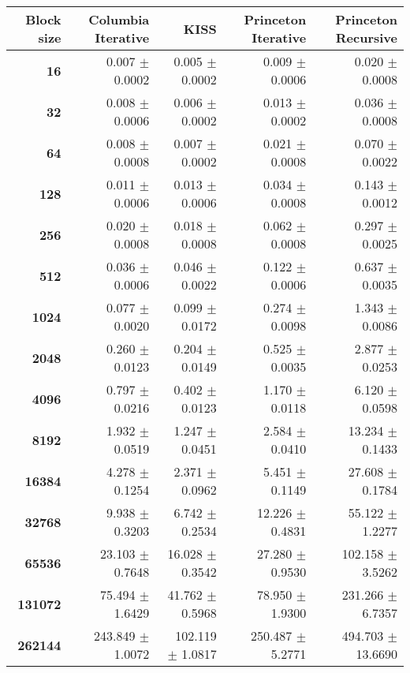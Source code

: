 \begin{tabular}{rrrrr}\toprule
\textbf{Block size}  & \textbf{Columbia Iterative} & \textbf{KISS} & \textbf{Princeton Iterative} & \textbf{Princeton Recursive}\\\midrule
\textbf{16}  & 0.007 $\pm$ 0.0002 & 0.005 $\pm$ 0.0002 & 0.009 $\pm$ 0.0006 & 0.020 $\pm$ 0.0008\\
\textbf{32}  & 0.008 $\pm$ 0.0006 & 0.006 $\pm$ 0.0002 & 0.013 $\pm$ 0.0002 & 0.036 $\pm$ 0.0008\\
\textbf{64}  & 0.008 $\pm$ 0.0008 & 0.007 $\pm$ 0.0002 & 0.021 $\pm$ 0.0008 & 0.070 $\pm$ 0.0022\\
\textbf{128}  & 0.011 $\pm$ 0.0006 & 0.013 $\pm$ 0.0006 & 0.034 $\pm$ 0.0008 & 0.143 $\pm$ 0.0012\\
\textbf{256}  & 0.020 $\pm$ 0.0008 & 0.018 $\pm$ 0.0008 & 0.062 $\pm$ 0.0008 & 0.297 $\pm$ 0.0025\\
\textbf{512}  & 0.036 $\pm$ 0.0006 & 0.046 $\pm$ 0.0022 & 0.122 $\pm$ 0.0006 & 0.637 $\pm$ 0.0035\\
\textbf{1024}  & 0.077 $\pm$ 0.0020 & 0.099 $\pm$ 0.0172 & 0.274 $\pm$ 0.0098 & 1.343 $\pm$ 0.0086\\
\textbf{2048}  & 0.260 $\pm$ 0.0123 & 0.204 $\pm$ 0.0149 & 0.525 $\pm$ 0.0035 & 2.877 $\pm$ 0.0253\\
\textbf{4096}  & 0.797 $\pm$ 0.0216 & 0.402 $\pm$ 0.0123 & 1.170 $\pm$ 0.0118 & 6.120 $\pm$ 0.0598\\
\textbf{8192}  & 1.932 $\pm$ 0.0519 & 1.247 $\pm$ 0.0451 & 2.584 $\pm$ 0.0410 & 13.234 $\pm$ 0.1433\\
\textbf{16384}  & 4.278 $\pm$ 0.1254 & 2.371 $\pm$ 0.0962 & 5.451 $\pm$ 0.1149 & 27.608 $\pm$ 0.1784\\
\textbf{32768}  & 9.938 $\pm$ 0.3203 & 6.742 $\pm$ 0.2534 & 12.226 $\pm$ 0.4831 & 55.122 $\pm$ 1.2277\\
\textbf{65536}  & 23.103 $\pm$ 0.7648 & 16.028 $\pm$ 0.3542 & 27.280 $\pm$ 0.9530 & 102.158 $\pm$ 3.5262\\
\textbf{131072}  & 75.494 $\pm$ 1.6429 & 41.762 $\pm$ 0.5968 & 78.950 $\pm$ 1.9300 & 231.266 $\pm$ 6.7357\\
\textbf{262144} & 243.849 $\pm$ 1.0072 & 102.119 $\pm$ 1.0817 & 250.487 $\pm$ 5.2771 & 494.703 $\pm$ 13.6690\\
\bottomrule
\end{tabular}
